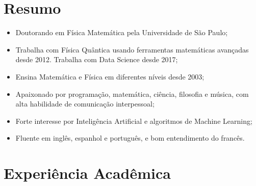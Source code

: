 \documentclass[11pt,a4paper,sans]{moderncv}        %
\begin{document}
\makecvtitle

\section{Resumo}

\begin{itemize} 
\item Doutorando em Física Matemática pela Universidade de São Paulo; 
\item Trabalha com Física Quântica usando ferramentas matemáticas avançadas desde 2012. Trabalha com Data Science desde 2017;
\item Ensina Matemática e Física em diferentes níveis desde 2003;
\item Apaixonado por programação, matemática, ciência, filosofia e música, com alta habilidade de comunicação interpessoal;
\item Forte interesse por Inteligência Artificial e algoritmos de Machine Learning;
\item Fluente em inglês, espanhol e português, e bom entendimento do francês.
\end{itemize} 

\section{Experiência Acadêmica}

\vspace{3pt}
\end{document}
